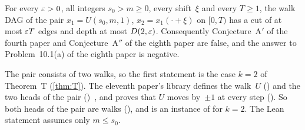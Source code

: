 \begin{corollary}\label{cor:dnp}
For every $\varepsilon>0$, all integers $s_0>m\ge0$, every shift~$\xi$ and every $T\ge1$, the walk DAG of the pair $x_1=U(s_0,m,1)$,
$x_2=x_1(\cdot+\xi)$ on $[0,T)$ has a cut of at most $\varepsilon T$ edges and depth at most $D(2,\varepsilon)$. Consequently Conjecture~A$'$
of the fourth paper and Conjecture~A$''$ of the eighth paper are false, and the answer to Problem~10.1(a) of the eighth paper is
negative.
\end{corollary}

\begin{outline}
The pair consists of two walks, so the first statement is the case $k=2$ of Theorem~T (\cref{thm:T}). The eleventh paper's
library defines the walk~$U$ () and the two heads of the pair
()~\cite[Section~7]{MergeDepth2026}, and proves that $U$ moves by~$\pm1$ at every step
(). So both heads of the pair  are walks (), and
 is an instance of  for $k=2$. The Lean statement assumes only $m\le s_0$.
\end{outline}

